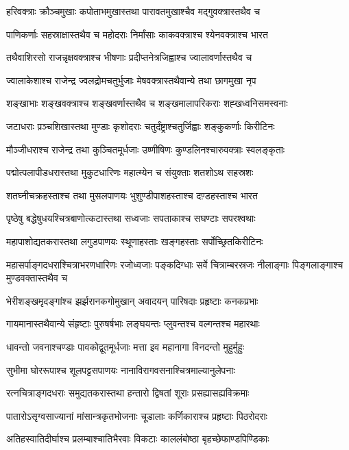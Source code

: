 \twolineshloka
{हरिवक्त्राः क्रौञ्चमुखाः कपोताभमुखास्तथा}
{पारावतमुखाश्चैव मद्गुवक्त्रास्तथैव च}


\twolineshloka
{पाणिकर्णाः सहस्राक्षास्तथैव च महोदराः}
{निर्मांसाः काकवक्त्राश्च श्येनवक्त्राश्च भारत}


\twolineshloka
{तथैवाशिरसो राजन्नृक्षवक्त्राश्च भीषणाः}
{प्रदीप्तनेत्रजिह्वाश्च ज्वालावर्णास्तथैव च}


\twolineshloka
{ज्वालाकेशाश्च राजेन्द्र ज्वलद्रोमचतुर्भुजाः}
{मेषवक्त्रास्तथैवान्ये तथा छागमुखा नृप}


\twolineshloka
{शङ्खाभाः शङ्खवक्त्राश्च शङ्खवर्णास्तथैव च}
{शङ्खमालापरिकराः शह्खध्वनिसमस्वनाः}


\twolineshloka
{जटाधराः प़ञ्चशिखास्तथा मुण्डाः कृशोदराः}
{चतुर्दंष्ट्राश्चतुर्जिह्वाः शङ्कुकर्णाः किरीटिनः}


\twolineshloka
{मौञ्जीधराश्च राजेन्द्र तथा कुञ्चितमूर्धजाः}
{उष्णीषिणः कुण्डलिनश्चारुवक्त्राः स्वलङ्कृताः}


\twolineshloka
{पद्मोत्पलापीडधरास्तथा मुकुटधारिणः}
{महात्म्येन च संयुक्ताः शतशोऽथ सहस्रशः}


\twolineshloka
{शतघ्नीचक्रहस्ताश्च तथा मुसलपाणयः}
{भुशुण्डीपाशहस्ताश्च दण़्डहस्ताश्च भारत}


\twolineshloka
{पृष्ठेषु बद्धेषुधयश्चित्रबाणोत्कटास्तथा}
{सध्वजाः सपताकाश्च सघण्टाः सपरश्वथाः}


\twolineshloka
{महापाशोद्यतकरास्तथा लगुडपाणयः}
{स्थूणाहस्ताः खङ्गहस्ताः सर्पोच्छ्रितकिरीटिनः}


\threelineshloka
{महासर्पाङ्गदधराश्चित्राभरणधारिणः}
{रजोध्वजाः पङ्कदिग्धाः सर्वे चित्राम्बरस्रजः}
{नीलाङ्गाः पिङ्गलाङ्गाश्च मुण्डवक्तास्तथैव च}


\twolineshloka
{भेरीशङ्खमृदङ्गांश्च झर्झरानकगोमुखान्}
{अवादयन् पारिषदाः प्रहृष्टाः कनकप्रभाः}


\twolineshloka
{गायमानास्तथैवान्ये संहृष्टाः पुरुषर्षभाः}
{लङ्घयन्तः प्लुवन्तश्च वल्गन्तश्च महारथाः}


\twolineshloka
{धावन्तो जवनाश्चण्डाः पावकोद्वूतमूर्धजाः}
{मत्ता इव महानागा विनदन्तो मुहुर्मुहुः}


\twolineshloka
{सुभीमा घोररूपाश्च शूलपट्टसपाणयः}
{नानाविरागवसनाश्चित्रमाल्यानुलेपनाः}


\twolineshloka
{रत्नचित्राङ्गदधराः समुद्यतकरास्तथा}
{हन्तारो द्विषतां शूराः प्रसह्यासह्यविक्रमाः}


\twolineshloka
{पातारोऽसृग्वसाज्यानां मांसान्त्रकृतभोजनाः}
{चूडालाः कर्णिकाराश्च प्रहृष्टाः पिठरोदराः}


\twolineshloka
{अतिहस्वातिदीर्घाश्च प्रलम्बाश्चातिभैरवाः}
{विकटाः काललंबोष्ठा बृहच्छेफाण्डपिण्डिकाः}


